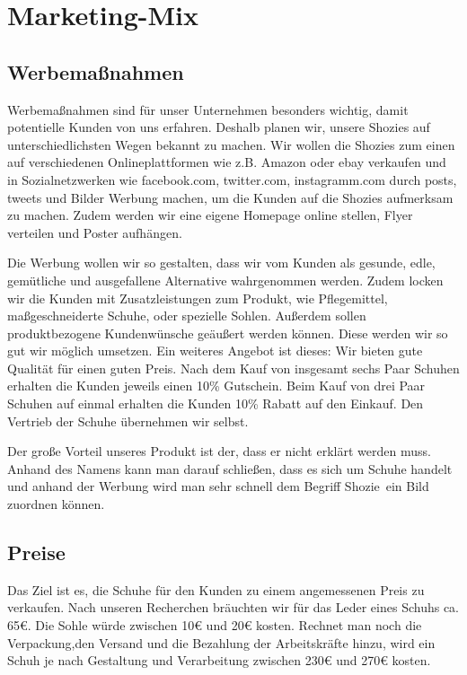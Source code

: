\chapter{Marketing-Mix}
\label{cha:6}

\section{Werbemaßnahmen}
Werbemaßnahmen sind für unser Unternehmen besonders wichtig, damit potentielle Kunden von uns erfahren. Deshalb planen wir, unsere Shozies auf unterschiedlichsten Wegen bekannt zu machen. Wir wollen die Shozies zum einen auf verschiedenen Onlineplattformen wie z.B. Amazon oder ebay verkaufen und in Sozialnetzwerken wie facebook.com, twitter.com, instagramm.com durch posts, tweets und Bilder Werbung machen, um die Kunden auf die Shozies aufmerksam zu machen. Zudem werden wir eine eigene Homepage online stellen, Flyer verteilen und Poster aufhängen. 

Die Werbung wollen wir so gestalten, dass wir vom Kunden als gesunde, edle, gemütliche und ausgefallene Alternative wahrgenommen werden. Zudem locken wir die Kunden mit Zusatzleistungen zum Produkt, wie Pflegemittel, maßgeschneiderte Schuhe, oder spezielle Sohlen. Außerdem sollen produktbezogene Kundenwünsche geäußert werden können. Diese werden wir so gut wir möglich umsetzen. Ein weiteres Angebot ist dieses: Wir bieten gute Qualität für einen guten Preis. Nach dem Kauf von insgesamt sechs Paar Schuhen erhalten die Kunden jeweils einen 10\% Gutschein. Beim Kauf von drei Paar Schuhen auf einmal erhalten die Kunden 10\% Rabatt auf den Einkauf. Den Vertrieb der Schuhe übernehmen wir selbst.

Der große Vorteil unseres Produkt ist der, dass er nicht erklärt werden muss. Anhand des Namens kann man darauf schließen, dass es sich um Schuhe handelt und anhand der Werbung wird man sehr schnell dem Begriff \glqq Shozie\grqq\ ein Bild zuordnen können. 

\section{Preise}
Das Ziel ist es, die Schuhe für den Kunden zu einem angemessenen Preis zu verkaufen. Nach unseren Recherchen bräuchten wir für das Leder eines Schuhs ca. 65€. Die Sohle würde zwischen 10€ und 20€ kosten. Rechnet man noch die Verpackung,den Versand und die Bezahlung der Arbeitskräfte hinzu, wird ein Schuh je nach Gestaltung und Verarbeitung zwischen 230€ und 270€ kosten.
